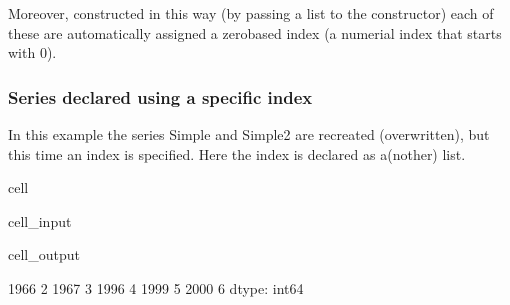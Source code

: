 \documentclass[letterpaper,10pt,english]{jupyterBook}
\begin{document}
\sphinxAtStartPar
Moreover, constructed in this way (by passing a list to the constructor) each of these  are automatically assigned a zero\sphinxhyphen{}based index (a numerial index that starts with 0).


\subsubsection{Series declared using a specific index}
\label{\detokenize{content/04_PythonEssentials/PythonPandasDataframes:series-declared-using-a-specific-index}}
\sphinxAtStartPar
In this example the series Simple and Simple2 are recreated (overwritten), but this time an index is specified. Here the index is declared as a(nother) list.

\begin{sphinxuseclass}{cell}\begin{sphinxVerbatimInput}

\begin{sphinxuseclass}{cell_input}
\begin{sphinxVerbatim}[commandchars=\\\{\}]
\PYG{p}{[}\PYG{p}{]}\PYG{p}{[}\PYG{p}{]}
\end{sphinxVerbatim}

\end{sphinxuseclass}\end{sphinxVerbatimInput}
\begin{sphinxVerbatimOutput}

\begin{sphinxuseclass}{cell_output}
\begin{sphinxVerbatim}[commandchars=\\\{\}]
1966    2
1967    3
1996    4
1999    5
2000    6
dtype: int64
\end{sphinxVerbatim}

\end{sphinxuseclass}\end{sphinxVerbatimOutput}

\end{sphinxuseclass}
\end{document}
